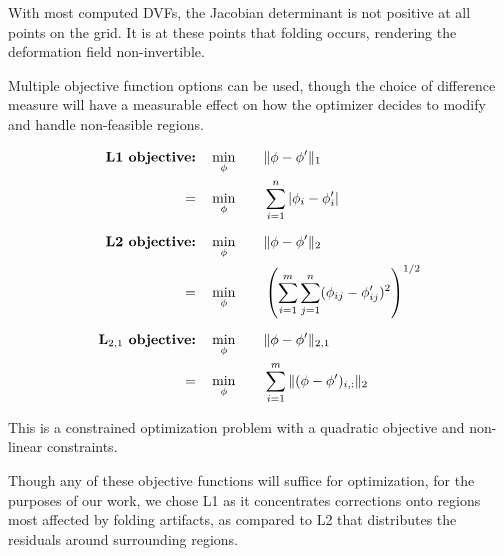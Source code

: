 \documentclass[lettersize,journal]{IEEEtran}
\begin{document}

With most computed DVFs, the Jacobian determinant is not positive at all points on the grid. It is at these points that folding occurs, rendering the deformation field non-invertible.

Multiple objective function options can be used, though the choice of difference measure will have a measurable effect on how the optimizer decides to modify and handle non-feasible regions.

\begin{alignat}{2}
\textbf{L1 objective:} \quad & \min_{\phi} \quad && \|\phi - \phi'\|_1 \notag \\
=\quad & \min_{\phi} \quad && \sum_{i=1}^{n} |\phi_i - \phi_i'| \\[6pt]
\textbf{L2 objective:} \quad & \min_{\phi} \quad && \|\phi - \phi'\|_2 \notag \\
=\quad & \min_{\phi} \quad && \left( \sum_{i=1}^{m} \sum_{j=1}^{n} (\phi_{ij} - \phi'_{ij})^2 \right)^{1/2}
 \\[6pt]
 \textbf{L$_{2,1}$ objective:} \quad & \min_{\phi} \quad && \|\phi - \phi'\|_{2,1} \notag \\
 =\quad & \min_{\phi} \quad && \sum_{i=1}^{m} \|(\phi - \phi')_{i,:}\|_2
\end{alignat}

This is a constrained optimization problem with a quadratic objective and non-linear constraints.

Though any of these objective functions will suffice for optimization, for the purposes of our work, we chose L1 as it concentrates corrections onto regions most affected by folding artifacts, as compared to L2 that distributes the residuals around surrounding regions.
\end{document}
